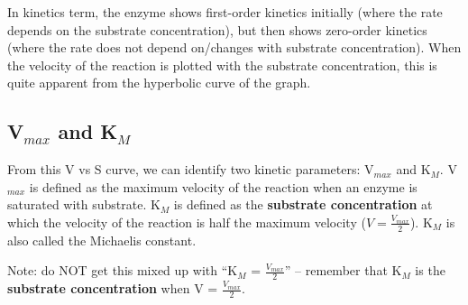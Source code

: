 In kinetics term, the enzyme shows first-order kinetics initially (where the rate depends on the substrate concentration), but then shows zero-order kinetics (where the rate does not depend on/changes with substrate concentration).
When the velocity of the reaction is plotted with the substrate concentration, this is quite apparent from the hyperbolic curve of the graph.

\subsection{V$_{max}$ and K$_M$}

From this V vs S curve, we can identify two kinetic parameters: V$_{max}$ and K$_M$.
V$_{max}$ is defined as the maximum velocity of the reaction when an enzyme is saturated with substrate.
K$_M$ is defined as the \textbf{substrate concentration} at which the velocity of the reaction is half the maximum velocity ($V = \frac{V_{max}}{2}$).
K$_M$ is also called the Michaelis constant.

Note: do NOT get this mixed up with ``K$_M$ = $\frac{V_{max}}{2}$'' -- remember that K$_M$ is the \textbf{substrate concentration} when V = $\frac{V_{max}}{2}$.









